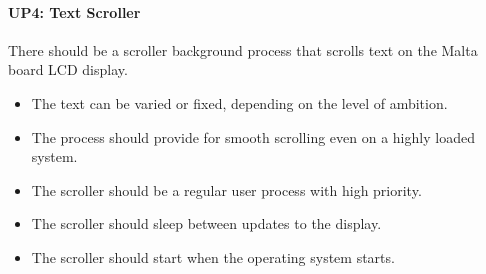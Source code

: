 \paragraph*{UP4: Text Scroller}

There should be a scroller background process that scrolls text on the Malta board LCD display.

\begin{itemize}
  \item The text can be varied or fixed, depending on the level of ambition.
  \item  The process should provide for smooth scrolling even on a highly loaded system.
  \item  The scroller should be a regular user process with high priority.
  \item  The scroller should sleep between updates to the display.
  \item  The scroller should start when the operating system starts.
\end{itemize}
